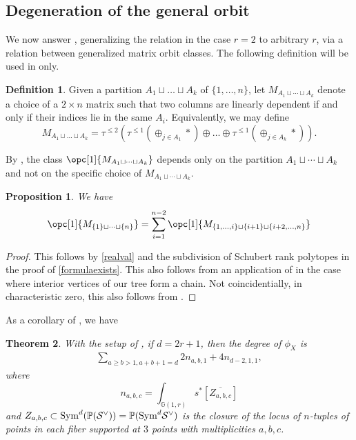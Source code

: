 \documentclass[12pt]{amsart}
\newcommand{\mb}{\mathbb}
\newcommand{\mc}{\mathcal}
\newcommand{\ol}{\overline}
\theoremstyle{plain}
\newtheorem{Thm}{Theorem}[section]
\newtheorem{Prop}[Thm]{Proposition}
\theoremstyle{definition}
\newtheorem{Def}{Definition}[section]
\theoremstyle{remark}
\begin{document}
\subsection{Degeneration of the general orbit}
\label{APFS}
We now answer , generalizing the relation in the case $r=2$ to arbitrary $r$, via a relation between generalized matrix orbit classes. The following definition will be used in  only. 

\begin{Def}
Given a partition $A_1\sqcup\ldots\sqcup A_k$ of $\{1,\ldots,n\}$, let $M_{A_1\sqcup\cdots\sqcup A_k}$ denote a choice of a $2\times n$ matrix such that two columns are linearly dependent if and only if their indices lie in the same $A_i$. Equivalently, we may define $$M_{A_1 \sqcup \ldots \sqcup A_k}= \tau^{\le 2}(\tau^{\le 1}(\oplus_{j \in A_1} \ast)\oplus\ldots\oplus\tau^{\le 1}(\oplus_{j \in A_k} \ast)).$$
\end{Def}

By , the class $\opc[1]{M_{A_1\sqcup\cdots \sqcup A_k}}$ depends only on the partition $A_1\sqcup\cdots \sqcup A_k$ and not on the specific choice of $M_{A_1\sqcup\cdots\sqcup A_k}$.

\begin{Prop}
\label{P1S}
We have 
\begin{align*}
\opc[1]{M_{\{1\}\sqcup\cdots\sqcup \{n\}}} = \sum_{i=1}^{n-2}{\opc[1]{M_{\{1,\ldots,i\}\sqcup \{i+1\}\sqcup \{i+2, \ldots,n\}}}}
\end{align*}
\end{Prop}

\begin{proof}
This follows by \cref{realval} and the subdivision of Schubert rank polytopes in the proof of \cref{formulaexists}. This also follows from an application of \cite[Theorem 1.3.6]{Kapranov} in the case where interior vertices of our tree form a chain. Not coincidentially, in characteristic zero, this also follows from .  
\end{proof}

As a corollary of , we have
\begin{Thm}
\label{APD}
With the setup of , if $d=2r+1$, then the degree of $\phi_X$ is
\begin{align*}
 \sum_{a\ge b>1,a+b+1=d}{2n_{a,b,1}}+4n_{d-2,1,1},
\end{align*}
where \[n_{a,b,c} = \int_{\mb{G}(1, r)}s^*[\ol{Z_{a,b,c}}]\] and $Z_{a,b,c} \subset {\rm Sym}^d(\mb{P}(\mc{S}^\vee)) = \mb{P}({\rm Sym}^d\mc{S}^\vee)$ is the closure of the locus of $n$-tuples of points in each fiber supported at $3$ points with multiplicities $a,b,c$.
\end{Thm}
\end{document}
